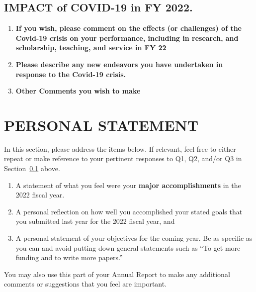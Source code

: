 \documentclass[11pt]{article}
\newcommand{\fy}{2022}
\begin{document}

\newpage
\subsection{IMPACT of COVID-19 in FY 2022.}\label{sec:covid}

\begin{enumerate}
\item
  \textbf{If you wish, please comment on the effects (or
  challenges) of the Covid-19 crisis on your performance, including in
  research, and scholarship, teaching, and service in FY 22}
\item
  \textbf{Please describe any new endeavors you have undertaken
  in response to the Covid-19 crisis.}
\item
  \textbf{Other Comments you wish to make}
\end{enumerate}


\newpage
\section{PERSONAL STATEMENT}

In this section, please address the items below. If relevant, feel free
to either repeat or make reference to your pertinent responses to Q1,
Q2, and/or Q3 in Section~\ref{sec:covid} above.

\begin{enumerate}
\item
  A statement of what you feel were your \textbf{major accomplishments}
  in the \fy{} fiscal year.
\item
  A personal reflection on how well you accomplished your stated goals
  that you submitted last year for the \fy{} fiscal year, and
\item
  A personal statement of your objectives for the coming year. Be as
  specific as you can and avoid putting down general statements such as
  ``To get more funding and to write more papers.''
\end{enumerate}

You may also use this part of your Annual Report to make any additional
comments or suggestions that you feel are important.
\end{document}

